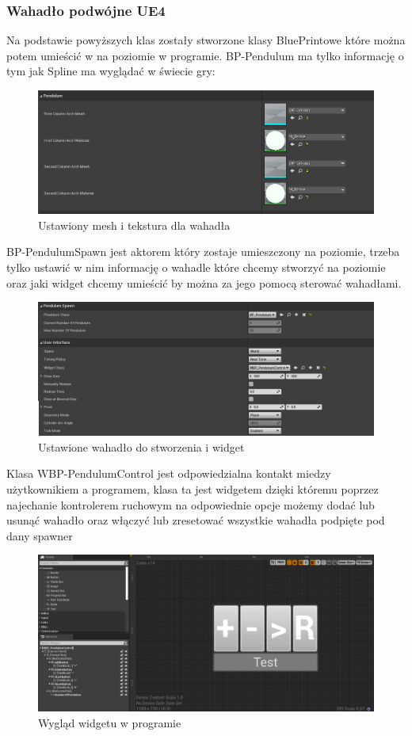 \documentclass[a4paper,12pt,reqno]{article}
\begin{document}
\subsubsection{Wahadło podwójne UE4}
Na podstawie powyższych klas zostały stworzone klasy BluePrintowe które można potem umieścić w na poziomie w programie. BP-Pendulum ma tylko informację o tym jak Spline ma wyglądać w świecie gry:

\begin{figure}[H]%
\centering
\includegraphics[width=0.7\columnwidth]{graphics/PendulumBP.png}
\caption{Ustawiony mesh i tekstura dla wahadła 
\label{BPExample}}%
%
\qquad
\end{figure}  

BP-PendulumSpawn jest aktorem który zostaje umieszczony na poziomie, trzeba tylko ustawić w nim informację o wahadle które chcemy stworzyć na poziomie oraz jaki widget chcemy umieścić by można za jego pomocą sterować wahadłami.

\begin{figure}[H]%
\centering
\includegraphics[width=0.7\columnwidth]{graphics/PendulumSpawnerBP.png}
\caption{Ustawione wahadło do stworzenia i widget 
\label{BPExample}}%
%
\qquad
\end{figure}  

Klasa WBP-PendulumControl jest odpowiedzialna kontakt miedzy użytkownikiem a programem, klasa ta jest widgetem dzięki któremu poprzez najechanie kontrolerem ruchowym na odpowiednie opcje możemy dodać lub usunąć wahadło oraz włączyć lub zresetować wszystkie wahadła podpięte pod dany spawner 

\begin{figure}[H]%
\centering
\includegraphics[width=0.7\columnwidth]{graphics/PendulumControlBP.png}
\caption{Wygląd widgetu w programie
\label{BPExample}}%
%
\qquad
\end{figure}  
\end{document}
